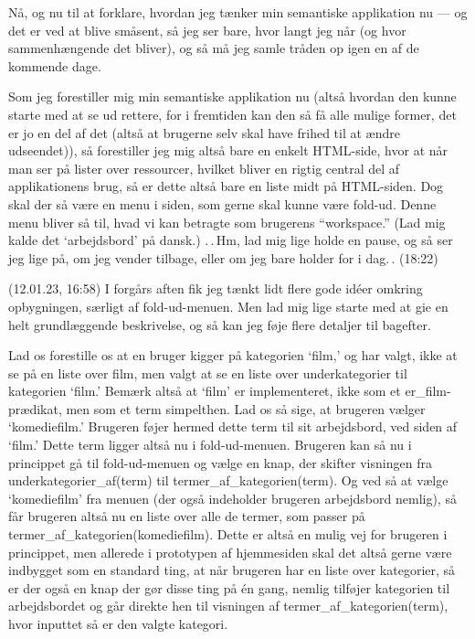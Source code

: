 \documentclass{report}
\begin{document}
Nå, og nu til at forklare, hvordan jeg tænker min semantiske applikation nu --- og det er ved at blive småsent, så jeg ser bare, hvor langt jeg når (og hvor sammenhængende det bliver), og så må jeg samle tråden op igen en af de kommende dage.

Som jeg forestiller mig min semantiske applikation nu (altså hvordan den kunne starte med at se ud rettere, for i fremtiden kan den så få alle mulige former, det er jo en del af det (altså at brugerne selv skal have frihed til at ændre udseendet)), så forestiller jeg mig altså bare en enkelt HTML-side, hvor at når man ser på lister over ressourcer, hvilket bliver en rigtig central del af applikationens brug, så er dette altså bare en liste midt på HTML-siden. Dog skal der så være en menu i siden, som gerne skal kunne være fold-ud. Denne menu bliver så til, hvad vi kan betragte som brugerens ``workspace.'' (Lad mig kalde det `arbejdsbord' på dansk.) .\,.\,Hm, lad mig lige holde en pause, og så ser jeg lige på, om jeg vender tilbage, eller om jeg bare holder for i dag.\,. (18:22)

(12.01.23, 16:58) I forgårs aften fik jeg tænkt lidt flere gode idéer omkring opbygningen, særligt af fold-ud-menuen. Men lad mig lige starte med at gie en helt grundlæggende beskrivelse, og så kan jeg føje flere detaljer til bagefter.

Lad os forestille os at en bruger kigger på kategorien `film,' og har valgt, ikke at se på en liste over film, men valgt at se en liste over underkategorier til kategorien `film.' Bemærk altså at `film' er implementeret, ikke som et er\_film-prædikat, men som et term simpelthen. Lad os så sige, at brugeren vælger `komediefilm.' Brugeren føjer hermed dette term til sit arbejdsbord, ved siden af `film.' Dette term ligger altså nu i fold-ud-menuen. Brugeren kan så nu i princippet gå til fold-ud-menuen og vælge en knap, der skifter visningen fra underkategorier\_af(term) til termer\_af\_kategorien(term). Og ved så at vælge `komediefilm' fra menuen (der også indeholder brugeren arbejdsbord nemlig), så får brugeren altså nu en liste over alle de termer, som passer på termer\_af\_kategorien(komediefilm). Dette er altså en mulig vej for brugeren i princippet, men allerede i prototypen af hjemmesiden skal det altså gerne være indbygget som en standard ting, at når brugeren har en liste over kategorier, så er der også en knap der gør disse ting på én gang, nemlig tilføjer kategorien til arbejdsbordet og går direkte hen til visningen af termer\_af\_kategorien(term), hvor inputtet så er den valgte kategori. 
\end{document}
